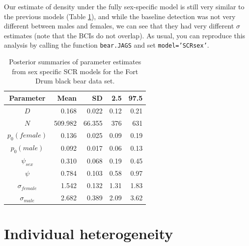 Our estimate of density under the fully sex-specific model is still
very similar to the previous models (Table
\ref{covariates.tab.SCRsex}), and while the baseline detection was not
very different between males and females, we can see that they had
very different $\sigma$ estimates (note that the BCIs do not overlap).
As usual, you can reproduce this analysis by calling the function 
{\tt bear.JAGS} and set {\tt model='SCRsex'}.

\begin{table}[ht]
\centering
\caption{Posterior summaries of parameter estimates from sex specific SCR models for the Fort Drum black bear data set.}
\begin{tabular}{crrrr}
\hline \hline
Parameter & Mean & SD & 2.5 & 97.5 \\
\hline
$D$  &     0.168 & 0.022 & 0.12 & 0.21  \\
$N$   &   509.982 & 66.355 & 376 & 631 \\
$p_0 (female)$ & 0.136 & 0.025 & 0.09 & 0.19 \\
$p_0 (male)$ & 0.092 & 0.017 & 0.06 & 0.13 \\
$\psi_{sex}$ &  0.310 & 0.068 & 0.19 & 0.45 \\
$\psi$  & 0.784 & 0.103 & 0.58 & 0.97 \\
$\sigma_{female}$ & 1.542 &  0.132 & 1.31 & 1.83 \\
$\sigma_{male}$ & 2.682 & 0.389 & 2.09 & 3.62 \\ \hline
\end{tabular}
\label{covariates.tab.SCRsex}
\end{table}



\section{Individual heterogeneity}

